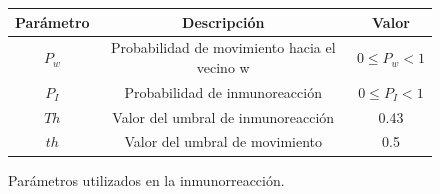 \begin{table}[!ht]
\begin{center}
\vspace*{-0.5cm}
\end{center}
\caption[Par\'ametros de la construcci\'on de la red utilizados por el modelo Watts-Strogatz]{Par\'ametros de la construcci\'on de la red utilizados por el modelo Watts-Strogatz.}
\label{table-network-params}
\end{table}

\begin{figure}[h!]%
    \begin{center}
        \begin{tabular}{|c|c|c|} \hline
        Par\'ametro & Descripci\'on  	                       & Valor 	\\ \hline
        $P_w$       & Probabilidad de movimiento hacia el vecino w&$0 \leq P_w  < 1  $			\\ \hline
        $P_I$ 	    & Probabilidad de inmunoreacci\'on         &$0 \leq P_I  < 1  $			\\ \hline
        $Th$		& Valor del umbral de inmunoreacci\'on     & 0.43			\\ \hline
        $th$		& Valor del umbral de movimiento           & 0.5 			\\ \hline
        \end{tabular}
    \caption{Par\'ametros utilizados en la inmunorreacci\'on. \label{fig:inmune_param}}
    \end{center}
    \end{figure}

